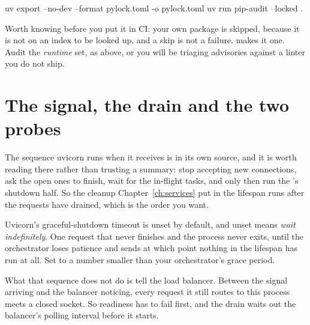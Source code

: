 \begin{shellcmd}
uv export --no-dev --format pylock.toml -o pylock.toml
uv run pip-audit --locked .
\end{shellcmd}

\noindent
Worth knowing before you put it in CI: your own package is skipped,
because it is not on an index to be looked up, and a skip is not a
failure.  makes it one. Audit the \emph{runtime} set,
as above, or you will be triaging advisories against a linter you do not
ship.

\section{The signal, the drain and the two probes}
\label{sec:ch12-shutdown}

The sequence uvicorn runs when it receives  is in its own
source, and it is worth reading there rather than trusting a summary:
stop accepting new connections, ask the open ones to finish, wait for the
in-flight tasks, and only then run the 's shutdown half. So
the cleanup Chapter~\ref{ch:services} put in the lifespan runs after the
requests have drained, which is the order you want.

\begin{warning}
Uvicorn's graceful-shutdown timeout is unset by default, and unset means
\emph{wait indefinitely}. One request that never finishes and the process
never exits, until the orchestrator loses patience and sends
 \dash{} at which point nothing in the lifespan has run at
all. Set  to a number smaller than your
orchestrator's grace period.
\end{warning}

\noindent
What that sequence does not do is tell the load balancer. Between the
signal arriving and the balancer noticing, every request it still routes
to this process meets a closed socket. So readiness has to fail first, and
the drain waits out the balancer's polling interval before it starts.




